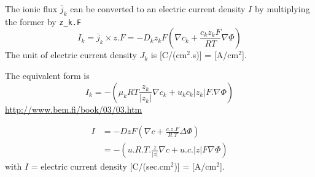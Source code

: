 The ionic flux $\bar{j}_k$ can be converted to an electric current density
$I$ by multiplying the former by \verb!z_k.F!
\begin{equation}
I_k = \bar{j}_k \times z.F = -D_k z_k F \left( \nabla c_k +
\frac{c_k z_k F}{RT} \nabla \Phi \right)
\end{equation}
The unit of electric current density $J_{k}$ is [C/(cm$^2$.s)] = [A/cm$^2$].

The equivalent form is
\begin{equation}
I_k = - \left(  \mu_k R T \frac{z_k}{|z_k|} \nabla c_k + u_k c_k
|z_k| F. \nabla \Phi \right)
\end{equation}
\url{http://www.bem.fi/book/03/03.htm}

\begin{mdframed}
\begin{equation}
  \label{eq:1242}
  \begin{split}
    I &= -DzF (\nabla c + \frac{c.z.F}{R.T}\Delta \Phi) \\
     &= - \left(u.R.T.\frac{z}{|z|}\nabla c + u.c.|z|F\nabla\Phi\right)
  \end{split}
\end{equation}
with $I$ = electric current density [C/(sec.cm$^2$)] = [A/cm$^2$].
\end{mdframed}

